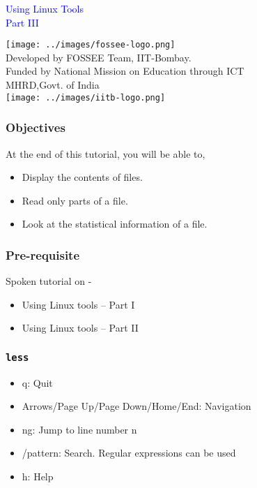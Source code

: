\documentclass[12pt,compress]{beamer}
\begin{document}
\begin{frame}

\begin{center}
\vspace{12pt}

\textcolor{blue}{\huge Using Linux Tools\\Part III}
\end{center}
\vspace{18pt}
\begin{center}
\vspace{10pt}
\texttt{[image: ../images/fossee-logo.png]}\\
\vspace{5pt}
\scriptsize Developed by FOSSEE Team, IIT-Bombay. \\ 
\scriptsize Funded by National Mission on Education through ICT\\
\scriptsize  MHRD,Govt. of India\\
\texttt{[image: ../images/iitb-logo.png]}\\
\end{center}
\end{frame}
\begin{frame}
\frametitle{Objectives}
\label{sec-2}

At the end of this tutorial, you will be able to,
\begin{itemize}
\item Display the contents of files.
\item Read only parts of a file.
\item Look at the statistical information of a file.
\end{itemize}
\end{frame}

\begin{frame}
\frametitle{Pre-requisite}
\label{sec-3}

Spoken tutorial on -
\begin{itemize}
\item Using Linux tools -- Part I
\item Using Linux tools -- Part II
\end{itemize}
\end{frame}

\begin{frame}[fragile]
  \frametitle{\texttt{less}}
   \begin{itemize}
  \item q: Quit
  \item Arrows/Page Up/Page Down/Home/End: Navigation
  \item ng: Jump to line number n
  \item /pattern: Search. Regular expressions can be used
  \item h: Help
  \end{itemize}
\end{frame}
\end{document}
